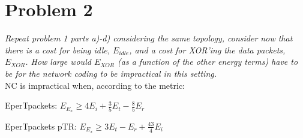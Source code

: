 \section{Problem 2}
\textit{Repeat problem 1 parts a)-d) considering the same topology, consider now that there is a cost for being idle, $E_{idle}$, and a cost for XOR'ing the data packets, $E_{XOR}$. How large would $E_{XOR}$ (as a function of the other energy terms) have to be for the network coding to be impractical in this setting.}\\

NC is impractical when, according to the metric:
\begin{pitemize}
\item EperTpackets: $E_{E_{x}}\geq 4E_{i}+\frac{3}{5}E_{t}-\frac{8}{5}E_{r}$
\item EperTpackets pTR: $E_{E_{x}}\geq 3E_{t}-E_{r}+\frac{43}{4}E_{i}$
\end{pitemize}